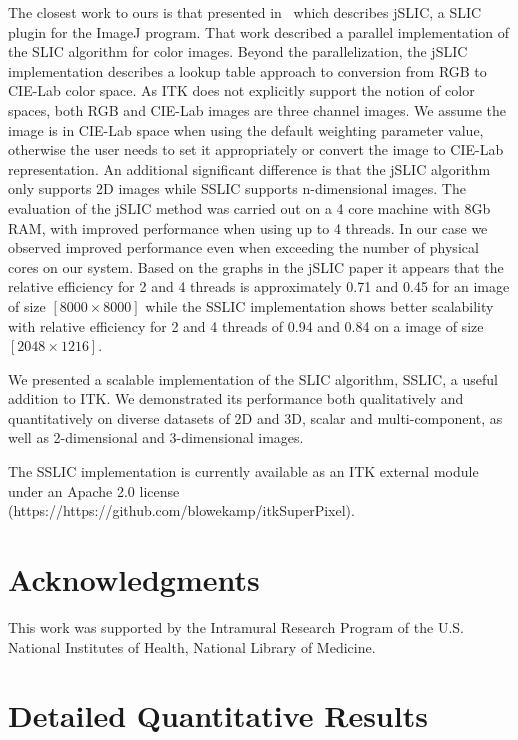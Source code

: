 \documentclass{InsightArticle}
\begin{document}
The closest work to ours is that presented in~\cite{borovec2014} which
describes jSLIC, a SLIC plugin for the ImageJ program. That work described a
parallel implementation of the SLIC algorithm for color images. Beyond the
parallelization, the jSLIC implementation describes a lookup table approach to
conversion from RGB to CIE-Lab color space. As ITK does not explicitly support
the notion of color spaces, both RGB and CIE-Lab images are three channel images.
We assume the image is in CIE-Lab space when using the default weighting
parameter value, otherwise the user needs to set it appropriately or convert the
image to CIE-Lab representation. An additional significant difference is that the
jSLIC algorithm only supports 2D images while SSLIC supports n-dimensional
images. The evaluation of the jSLIC method was carried out on a 4 core machine
with 8Gb RAM, with improved performance when using up to 4 threads. In our case
we observed improved performance even when exceeding the number of physical
cores on our system. Based on the graphs in the jSLIC paper it appears that the
relative efficiency for 2 and 4 threads is approximately 0.71 and 0.45 for an
image of size $[8000 \times 8000]$ while the SSLIC implementation shows better
scalability with relative efficiency for 2 and 4 threads of 0.94 and 0.84 on a
image of size $[2048 \times 1216]$.

We presented a scalable implementation of the SLIC algorithm, SSLIC, a useful
addition to ITK. We demonstrated its performance both qualitatively and
quantitatively on diverse datasets of 2D and 3D, scalar and multi-component, as
well as 2-dimensional and 3-dimensional images.


The SSLIC implementation is currently available as an ITK external module under
an Apache 2.0 license (https://https://github.com/blowekamp/itkSuperPixel).

\section*{Acknowledgments}

This work was supported by the Intramural Research Program of the U.S. National Institutes of Health, National
Library of Medicine.




\appendix
	
\newpage
	
\section{Detailed Quantitative Results}
\end{document}
